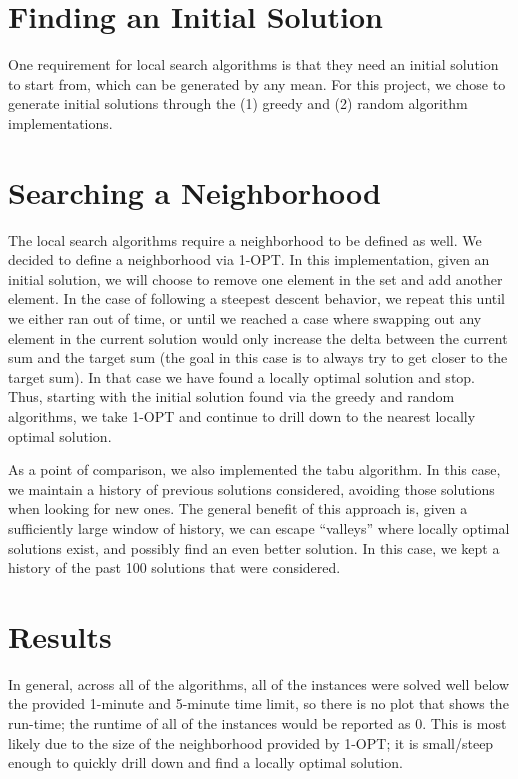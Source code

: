 \documentclass{report}
\begin{document}
\section{Finding an Initial Solution}
One requirement for local search algorithms is that they need an initial solution to start from, which
can be generated by any mean. For this project, we chose to generate initial
solutions through the (1) greedy and (2) random algorithm implementations.

\section{Searching a Neighborhood}
The local search algorithms require a neighborhood to be defined as well. We decided to define a neighborhood
via 1-OPT. In this implementation, given an initial solution, we will choose to remove one element in the set
and add another element. In the case of following a steepest descent behavior, we repeat this until we
either ran out of time, or until we reached a case where swapping out any element in the current solution
would only increase the delta between the current sum and the target sum (the goal in this case is to always try to
get closer to the target sum). In that case we have found a locally
optimal solution and stop. Thus, starting with the initial solution found via the greedy and random
algorithms, we take 1-OPT and continue to drill down to the nearest locally optimal solution.

As a point of comparison, we also implemented the tabu algorithm. In this case, we maintain a history
of previous solutions considered, avoiding those solutions when looking for new ones. The general
benefit of this approach is, given a sufficiently large window of history, we can escape ``valleys''
where locally optimal solutions exist, and possibly find an even better solution. In this case,
we kept a history of the past 100 solutions that were considered.

\section{Results}
In general, across all of the algorithms, all of the instances were solved well below the provided 1-minute
and 5-minute time limit, so there is no plot that shows the run-time; the runtime of all of the instances would be
reported as 0. This is most likely due to the size of the neighborhood provided by 1-OPT; it is small/steep enough
to quickly drill down and find a locally optimal solution.
\end{document}
